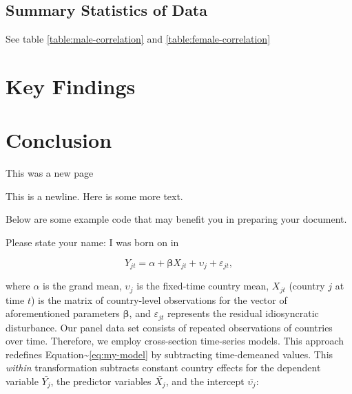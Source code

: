 \documentclass[]{article}
\begin{document}
\subsection{Summary Statistics of Data}
\label{sec:data-summary}

\noindent 

See table \ref{table:male-correlation} and
\ref{table:female-correlation} \newpage





\section{Key Findings}
\label{sec:findings}

\section{Conclusion}
\label{sec:conclusion}

\newpage

This was a new page

This is a newline. \newline  Here is some more text.

Below are some example code that may benefit you in preparing your
document. \newline

\vspace{0.25in}

\noindent Please state your name: \hrulefill \newline I was born on
\hrulefill in \hrulefill \vspace{0.25in}

\begin{equation}
\label{eq:my-model}
    Y_{jt} = \alpha + \bm{\beta}X_{jt} + \upsilon_{j}  + \varepsilon_{jt} ,
\end{equation}

\noindent where \(\alpha\) is the grand mean, \(\upsilon_{j}\) is the
fixed-time country mean, \(X_{jt}\) (country \(j\) at time \(t\)) is the
matrix of country-level observations for the vector of aforementioned
parameters \(\bm{\beta}\), and \(\varepsilon_{jt}\) represents the
residual idiosyncratic disturbance. Our panel data set consists of
repeated observations of countries over time. Therefore, we employ
cross-section time-series models. This approach redefines
Equation\textasciitilde{}\ref{eq:my-model} by subtracting time-demeaned
values. This \emph{within} transformation subtracts constant country
effects for the dependent variable \(\bar{Y_{j}}\), the predictor
variables \(\bar{X_{j}}\), and the intercept \(\bar{\upsilon_{j}}\):
\end{document}

